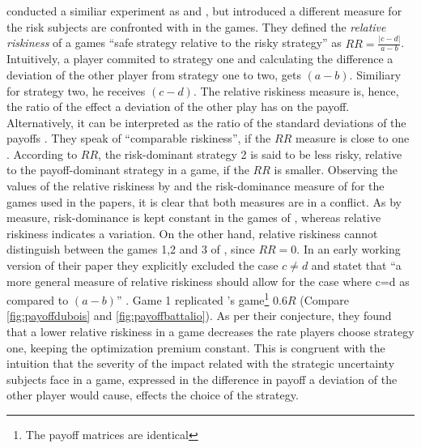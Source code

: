 \documentclass[11pt]{article}
\begin{document}
\textcite{dubois_optimization_2012} conducted a similiar experiment as 
\textcite{schmidt_playing_2003} and \textcite{battalio_optimization_2001},
but introduced a different measure for the risk subjects are confronted with in
the games. They defined the \textit{relative riskiness} of a games 
``safe strategy relative to the risky strategy'' as $RR = \frac{|c-d|}{a-b}$. 
Intuitively, a player commited to strategy one and calculating the 
difference a deviation of the other player from strategy one to two, gets
$(a-b)$. Similiary for strategy two, he receives $(c-d)$. The relative riskiness
measure is, hence, the ratio of the effect a deviation of the other play has 
on the payoff. Alternatively, it can be interpreted as the ratio of the 
standard deviations of the payoffs 
\parencite[372]{dubois_optimization_2012}. 
They speak of ``comparable riskiness'', if the $RR$ measure is close to one 
\parencite[372]{dubois_optimization_2012}. 
According to $RR$, the risk-dominant 
strategy 2 is said to be less risky, relative to the 
payoff-dominant strategy in a game, if the $RR$ is smaller.
Observing the values of the relative riskiness by 
\textcite{dubois_optimization_2012} and the risk-dominance measure of 
\textcite{schmidt_playing_2003} for the games used in the papers, it is clear
that both measures are in a conflict. As by \textcite{schmidt_playing_2003}
measure, risk-dominance is kept constant in the games of 
\textcite{battalio_optimization_2001}, whereas relative riskiness indicates a
variation. On the other hand, relative riskiness cannot distinguish between
the games 1,2 and 3 of \textcite{schmidt_playing_2003}, since $RR=0$. In an
early working version of their paper they explicitly excluded the case 
$c \neq d$ and statet that ``a more general measure of relative riskiness 
should allow for the case where c=d as compared to $(a-b)$'' 
\parencite{dubois_optimization_2008}. 
Game 1 replicated \textcite{battalio_optimization_2001}'s 
game\footnote{The payoff matrices are identical} $0.6R$ (Compare \ref{fig:payoffdubois} and \ref{fig:payoffbattalio}). 
As per their conjecture, they found that a lower relative riskiness 
in a game decreases the rate players choose strategy one, 
keeping the optimization premium constant. This is congruent with 
the intuition that the severity of the impact related with the 
strategic uncertainty subjects face in a game, expressed in
the difference in payoff a deviation of the other player would cause,
effects the choice of the strategy. 
\end{document}
